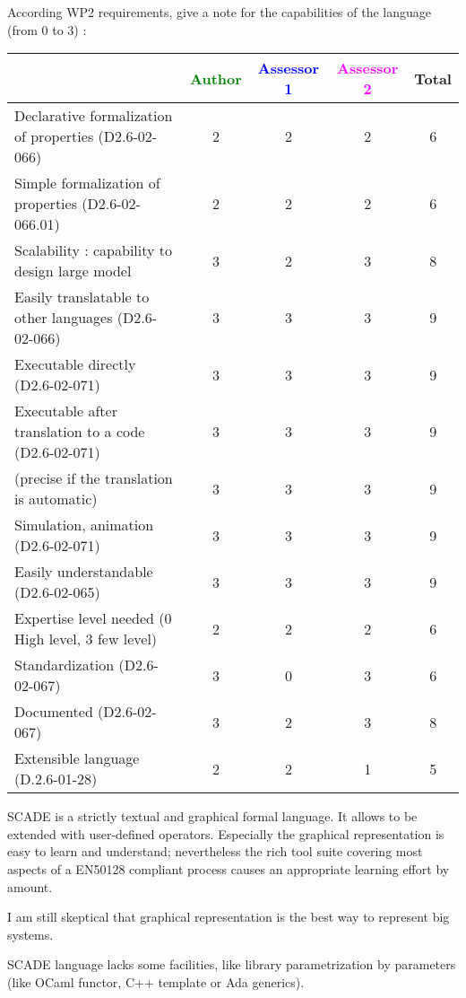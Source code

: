 According WP2 requirements, give a note for the capabilities of the language (from 0 to 3) :

\begin{tabular}{|l | c | c | c | c|}
\hline
& \textcolor{green}{Author} & \textcolor{blue}{Assessor 1} & \textcolor{magenta}{Assessor 2} & Total \\
\hline
Declarative formalization of properties (D2.6-02-066) &
2  & 2 &2 & 6 \\
\hline
Simple formalization of properties (D2.6-02-066.01) &
2 & 2 &2 & 6 \\
\hline
Scalability : capability to design large model &  3
& 2 &3 & 8 \\
\hline
Easily translatable to other languages (D2.6-02-066) &
3  & 3 &3 & 9 \\
\hline
Executable directly (D2.6-02-071) & 3  & 3 &3 & 9 \\
\hline
Executable after translation to a code (D2.6-02-071) &
3& 3 &3 & 9 \\
(precise if the translation is automatic) &  3& 3 &3 & 9 \\
\hline
Simulation, animation (D2.6-02-071) &  3 & 3 &3 & 9 \\
\hline
Easily understandable (D2.6-02-065) &  3& 3 &3 & 9 \\
\hline
Expertise level needed (0 High level, 3 few level) &
2 & 2 &2 & 6 \\
\hline
Standardization (D2.6-02-067) &  3& 0 &3 & 6 \\
\hline
Documented (D2.6-02-067) &  3 & 2 &3 & 8 \\
\hline
Extensible language (D.2.6-01-28) &  2& 2 &1 & 5 \\
\hline
\end{tabular}
\begin{author_comment}
SCADE is a strictly textual and graphical formal language. It allows to be extended with user-defined operators. Especially the graphical representation is easy to learn and understand; nevertheless the rich tool suite covering most aspects of a EN50128 compliant process causes an appropriate learning effort by amount.
\end{author_comment}


\begin{assessor1}
  I am still skeptical that graphical representation is the best way
  to represent big systems.

  SCADE language lacks some facilities, like library parametrization
  by parameters (like OCaml functor, C++ template or Ada generics).
\end{assessor1}

